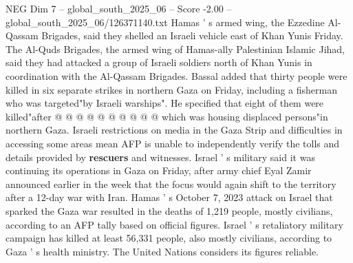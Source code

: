 \begin{textsample}{NEG Dim 7 – global\_south\_2025\_06 – Score -2.00 – global\_south\_2025\_06/126371140.txt}
Hamas ' s armed wing, the Ezzedine Al-Qassam Brigades, said they shelled an Israeli vehicle east of Khan Yunis Friday.
The Al-Quds Brigades, the armed wing of Hamas-ally Palestinian Islamic Jihad, said they had attacked a group of Israeli soldiers north of Khan Yunis in coordination with the Al-Qassam Brigades.
Bassal added that thirty people were killed in six separate strikes in northern Gaza on Friday, including a fisherman who was targeted"by Israeli warships".
He specified that eight of them were killed"after @ @ @ @ @ @ @ @ @ @ which was housing displaced persons"in northern Gaza.
Israeli restrictions on media in the Gaza Strip and difficulties in accessing some areas mean AFP is unable to independently verify the tolls and details provided by \textbf{rescuers} and witnesses.
Israel ' s military said it was continuing its operations in Gaza on Friday, after army chief Eyal Zamir announced earlier in the week that the focus would again shift to the territory after a 12-day war with Iran.
Hamas ' s October 7, 2023 attack on Israel that sparked the Gaza war resulted in the deaths of 1,219 people, mostly civilians, according to an AFP tally based on official figures.
Israel ' s retaliatory military campaign has killed at least 56,331 people, also mostly civilians, according to Gaza ' s health ministry.
The United Nations considers its figures reliable.

\end{textsample}
